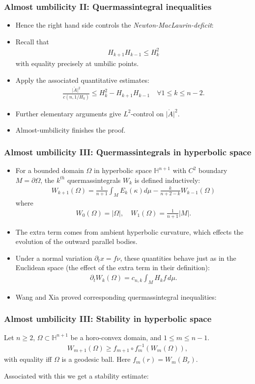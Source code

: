 \documentclass{beamer}
\newcommand{\mr}{\mathring}
\newcommand{\8}{\infty}
\newcommand{\Om}{\Omega}
\newcommand{\del}{\partial}
\newcommand{\fa}{\forall}
\newcommand{\fr}[2]{\frac{#1}{#2}}
\newcommand{\eq}[1]{\begin{equation}\begin{alignedat}{2} #1 \end{alignedat}\end{equation}}
\newcommand{\abs}[1]{\lvert #1\rvert}
\newcommand{\q}{\quad}
\begin{document}
\begin{frame} 
\frametitle{Almost umbilicity II: Quermassintegral inequalities}
\begin{itemize}
	\item[] Hence the right hand side controls the {\it{Newton-MacLaurin-deficit}}:
	\item[] Recall that
	\eq{H_{k+1}H_{k-1}\leq H_{k}^{2}}
	with equality precisely at umbilic points.
	\item[]
Apply the associated quantitative estimates:
\eq{\fr{\abs{\mr{A}}^{2}}{c(n,1/H_{k})}\leq H_{k}^{2}-H_{k+1}H_{k-1}\q\fa 1\leq k\leq n-2.}
	\item[] Further elementary arguments give $L^{2}$-control on $\abs{\mr{A}}^{2}$.
	\item[] Almost-umbilicity finishes the proof.
\end{itemize}
\end{frame}



\begin{frame} 
\frametitle{Almost umbilicity III: Quermassintegrals in hyperbolic space }
\begin{itemize}
	\item[] For a bounded domain $\Omega$ in hyperbolic space $\mathbb{H}^{n+1}$ with $C^{2}$ boundary $M= \partial \Omega$, the $k^{th}$ quermassintegrals $W_{k}$ is defined inductively:
\eq{
W_{k+1}(\Omega)= \frac{1}{n+1}\int_{M}E_{k}(\kappa)d\mu - \frac{k}{n+2-k}W_{k-1}(\Omega)}
where
\eq{W_{0}(\Omega) = \abs{\Om},\q
W_{1}(\Omega)= \frac{1}{n+1}\lvert M\rvert.
}
	\item[] The extra term comes from ambient hyperbolic curvature, which effects the evolution of the outward parallel bodies.
	\item[]Under a normal variation $\del_{t}x = f\nu$, these quantities behave just as in the Euclidean space (the effect of the extra term in their definition):
	\eq{\del_{t}W_{k}(\Om) = c_{n,k}\int_{M}H_{k}f\,d\mu.}
	\item[] Wang and Xia proved corresponding quermassintegral inequalities:
	 \end{itemize}
\end{frame}




\begin{frame} 
\frametitle{Almost umbilicity III: Stability in hyperbolic space }
\begin{theorem}
Let $n\geq 2$, $\Omega \subset \mathbb{H}^{n+1}$ be a horo-convex domain, and $1\leq m\leq n-1$.
\eq{W_{m+1}(\Om)\geq f_{m+1}\circ f_{m}^{-1}(W_{m}(\Om)),}
with equality iff $\Om$ is a geodesic ball. Here $f_{m}(r)=W_{m}(B_{r})$.
\end{theorem}  
Associated with this we get a stability estimate:
\end{frame}
\end{document}
